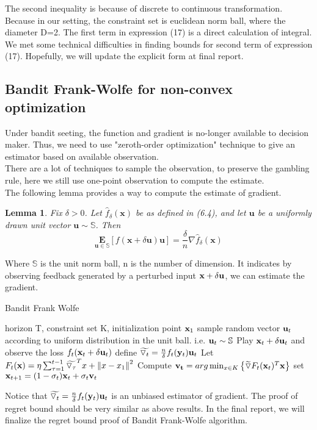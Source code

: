 \documentclass[12pt]{article}
\newtheorem{lemma}{Lemma}
\begin{document}
The second inequality is because of discrete to continuous transformation. Because in our setting, the constraint set is euclidean norm ball, where the diameter D=2. The first term in expression (17) is a direct calculation of integral.\\
We met some technical difficulties in finding bounds for second term of expression (17). Hopefully, we will update the explicit form at final report.
\subsection{Bandit Frank-Wolfe for non-convex optimization}
Under bandit seeting, the function and gradient is no-longer available to decision maker. Thus, we need to use "zeroth-order optimization" technique to give an estimator based on available observation.\\
There are a lot of techniques to sample the observation, to preserve the gambling rule, here we still use one-point observation to compute the estimate.\\
The following lemma provides a way to compute the estimate of gradient.\\
\begin{lemma}
    Fix $\delta>0$. Let $\hat{f}_\delta(\mathbf{x})$ be as defined in (6.4), and let $\mathbf{u}$ be a uniformly drawn unit vector $\mathbf{u} \sim \mathbb{S}$. Then
$$
\underset{\mathbf{u} \in \mathbb{S}}{\mathbf{E}}[f(\mathbf{x}+\delta \mathbf{u}) \mathbf{u}]=\frac{\delta}{n} \nabla \hat{f}_\delta(\mathbf{x})
$$
\end{lemma}
Where $\mathbb{S}$ is the unit norm ball, n is the number of dimension. It indicates by observing feedback generated by a perturbed input $\bold{x}+\delta \bold{u}$, we can estimate the gradient.\\
\begin{algorithm}[H]
\caption{Bandit Frank Wolfe}\label{ofw}
\begin{algorithmic}
\Require horizon T, constraint set K, initialization point $\bold{x}_1$
\State sample random vector $\bold{u}_t$ according to uniform distribution in the unit ball. i.e. $\bold{u}_t \sim \mathbb{S}$
\State Play $\bold{x}_t+\delta \bold{u}_t$ and observe the loss $f_t(\bold{x}_t+\delta \bold{u}_t)$
\State define $\widetilde{\triangledown_t} = \frac{n}{\delta}f_t(\bold{y}_t)\bold{u}_t$
\State Let $F_t(\bold{x}) = \eta 
\sum_{\tau=1}^{t-1} \widetilde{\triangledown_{\tau}}^Tx + \left \| x-x_1 \right \|^2$
\State Compute $\bold{v_t} = arg \min_{x\in K} \left \{ 
\widetilde{\triangledown} F_t(\bold{x}_t)^T \bold{x} \right \}$
\State set $\bold{x}_{t+1} = (1-\sigma_t)\bold{x}_t+\sigma_t \bold{v}_t$
\EndFor
\end{algorithmic}
\end{algorithm}
Notice that $\widetilde{\triangledown_t} = \frac{n}{\delta}f_t(\bold{y}_t)\bold{u}_t$ is an unbiased estimator of gradient. The proof of regret bound should be very similar as above results. In the final report, we will finalize the regret bound proof of Bandit Frank-Wolfe algorithm.
\end{document}
